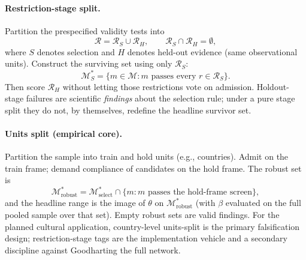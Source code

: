 \documentclass[10pt,letterpaper]{article}
\newcommand{\M}{\ensuremath{\mathcal{M}}}
\newcommand{\Rset}{\mathcal{R}}
\begin{document}
\paragraph{Restriction-stage split.}
Partition the prespecified validity tests into
\begin{equation}
\Rset=\Rset_S\cup\Rset_H,\qquad \Rset_S\cap\Rset_H=\emptyset,
\label{eq:partition}
\end{equation}
where $S$ denotes selection and $H$ denotes held-out evidence (same observational units).
Construct the surviving set using only $\Rset_S$:
\begin{equation}
\M^*_S=\bigl\{m\in\M: m\text{ passes every }r\in\Rset_S\bigr\}.
\label{eq:Mselect}
\end{equation}
Then score $\Rset_H$ without letting those restrictions vote on admission.
Holdout-stage failures are scientific \emph{findings} about the selection rule; under a pure stage split they do not, by themselves, redefine the headline survivor set.

\paragraph{Units split (empirical core).}
Partition the sample into train and hold units (e.g., countries).
Admit on the train frame; demand compliance of candidates on the hold frame.
The robust set is
\begin{equation}
\M^*_{\mathrm{robust}}=\M^*_{\mathrm{select}}\cap\bigl\{m:\text{$m$ passes the hold-frame screen}\bigr\},
\label{eq:Mrobust}
\end{equation}
and the headline range is the image of $\theta$ on $\M^*_{\mathrm{robust}}$ (with $\beta$ evaluated on the full pooled sample over that set).
Empty robust sets are valid findings.
For the planned cultural application, country-level units-split is the primary falsification design; restriction-stage tags are the implementation vehicle and a secondary discipline against Goodharting the full network.
\end{document}
